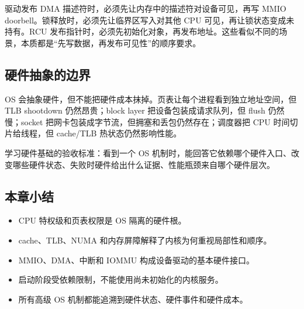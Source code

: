 驱动发布 DMA 描述符时，必须先让内存中的描述符对设备可见，再写 MMIO doorbell。锁释放时，必须先让临界区写入对其他 CPU 可见，再让锁状态变成未持有。RCU 发布指针时，必须先初始化对象，再发布地址。这些看似不同的场景，本质都是“先写数据，再发布可见性”的顺序要求。

\subsection{硬件抽象的边界}

OS 会抽象硬件，但不能把硬件成本抹掉。页表让每个进程看到独立地址空间，但 TLB shootdown 仍然昂贵；block layer 把设备包装成请求队列，但 flush 仍然慢；socket 把网卡包装成字节流，但拥塞和丢包仍然存在；调度器把 CPU 时间切片给线程，但 cache/TLB 热状态仍然影响性能。

\begin{rubricbox}
学习硬件基础的验收标准：看到一个 OS 机制时，能回答它依赖哪个硬件入口、改变哪些硬件状态、失败时硬件给出什么证据、性能瓶颈来自哪个硬件层次。
\end{rubricbox}

\subsection{本章小结}

\begin{itemize}
\tightlist
\item CPU 特权级和页表权限是 OS 隔离的硬件根。
\item cache、TLB、NUMA 和内存屏障解释了内核为何重视局部性和顺序。
\item MMIO、DMA、中断和 IOMMU 构成设备驱动的基本硬件接口。
\item 启动阶段受依赖限制，不能使用尚未初始化的内核服务。
\item 所有高级 OS 机制都能追溯到硬件状态、硬件事件和硬件成本。
\end{itemize}
